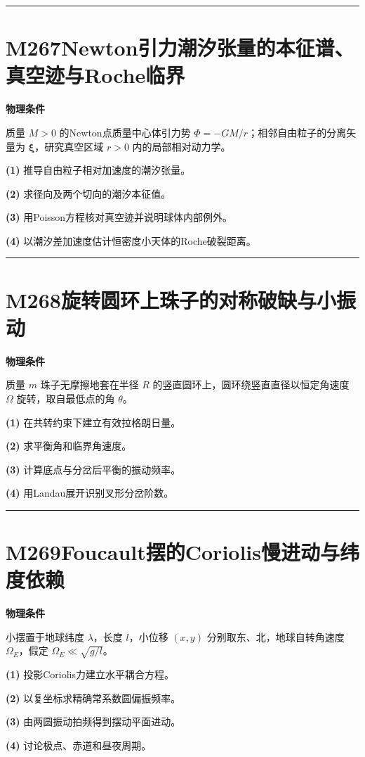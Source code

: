 \documentclass[UTF8,a4paper,11pt,oneside,openany]{ctexbook}
\begin{document}
\par\bigskip\hrule\bigskip
\section*{M267\quad Newton引力潮汐张量的本征谱、真空迹与Roche临界}
\textbf{物理条件}\par 质量 \(M>0\) 的Newton点质量中心体引力势 \(\Phi=-GM/r\)；相邻自由粒子的分离矢量为 \(\boldsymbol\xi\)，研究真空区域 \(r>0\) 内的局部相对动力学。
\par\noindent\textbf{(1)} 推导自由粒子相对加速度的潮汐张量。
\par\noindent\textbf{(2)} 求径向及两个切向的潮汐本征值。
\par\noindent\textbf{(3)} 用Poisson方程核对真空迹并说明球体内部例外。
\par\noindent\textbf{(4)} 以潮汐差加速度估计恒密度小天体的Roche破裂距离。

\par\bigskip\hrule\bigskip
\section*{M268\quad 旋转圆环上珠子的对称破缺与小振动}
\textbf{物理条件}\par 质量 \(m\) 珠子无摩擦地套在半径 \(R\) 的竖直圆环上，圆环绕竖直直径以恒定角速度 \(\Omega\) 旋转，取自最低点的角 \(\theta\)。
\par\noindent\textbf{(1)} 在共转约束下建立有效拉格朗日量。
\par\noindent\textbf{(2)} 求平衡角和临界角速度。
\par\noindent\textbf{(3)} 计算底点与分岔后平衡的振动频率。
\par\noindent\textbf{(4)} 用Landau展开识别叉形分岔阶数。

\par\bigskip\hrule\bigskip
\section*{M269\quad Foucault摆的Coriolis慢进动与纬度依赖}
\textbf{物理条件}\par 小摆置于地球纬度 \(\lambda\)，长度 \(l\)，小位移 \((x,y)\) 分别取东、北，地球自转角速度 \(\Omega_E\)，假定 \(\Omega_E\ll\sqrt{g/l}\)。
\par\noindent\textbf{(1)} 投影Coriolis力建立水平耦合方程。
\par\noindent\textbf{(2)} 以复坐标求精确常系数圆偏振频率。
\par\noindent\textbf{(3)} 由两圆振动拍频得到摆动平面进动。
\par\noindent\textbf{(4)} 讨论极点、赤道和昼夜周期。
\end{document}
